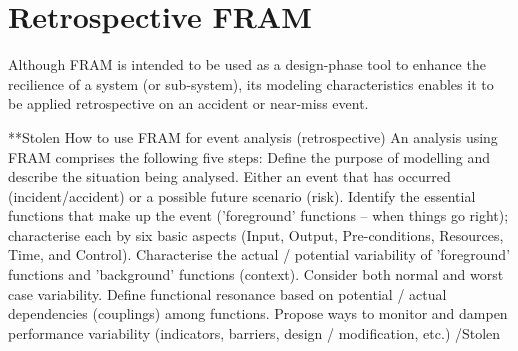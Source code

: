 \section{Retrospective FRAM}
Although FRAM is intended to be used as a design-phase tool to enhance the recilience of a system (or sub-system), its modeling characteristics enables it to be applied retrospective on an accident or near-miss event.

**Stolen
How to use FRAM for event analysis (retrospective)
An analysis using FRAM comprises the following five steps:
Define the purpose of modelling and describe the situation being analysed. Either an event that has occurred (incident/accident) or a possible future scenario (risk).
Identify the essential functions that make up the event ('foreground' functions – when things go right); characterise each by six basic aspects (Input, Output, Pre-conditions, Resources, Time, and Control). 
Characterise the actual / potential variability of 'foreground' functions and 'background' functions (context). Consider both normal and worst case variability.
Define functional resonance based on potential  / actual dependencies (couplings) among functions.
Propose ways to monitor and dampen performance variability (indicators, barriers, design / modification, etc.)
/Stolen
